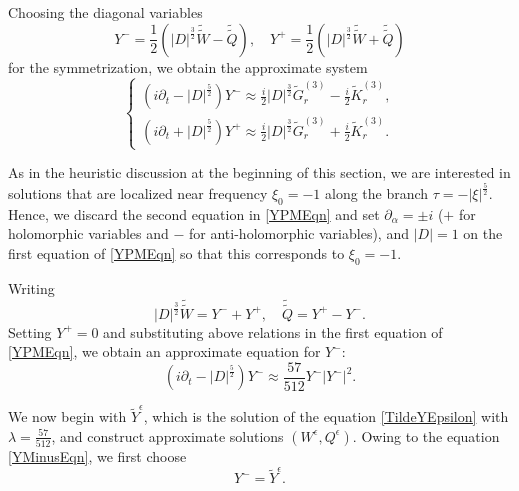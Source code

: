 \documentclass[12pt]{amsart}
\theoremstyle{remark}
\theoremstyle{definition}
\numberwithin{equation}{section}
\newcommand{\p}{\partial}
\newcommand{\al}{\alpha}
\newcommand{\f}{\frac}
\begin{document}
Choosing the diagonal variables  
\begin{equation*}
Y^- = \f12(|D|^\f32\tilde{\tilde{W}}- \tilde{\tilde{Q}}), \quad Y^+ = \f12(|D|^\f32\tilde{\tilde{W}}+ \tilde{\tilde{Q}})
\end{equation*}
for the symmetrization, we obtain the approximate system 
\begin{equation} \label{YPMEqn}
\begin{cases}
(i\partial_t-|D|^\f52)Y^- \approx \frac{i}{2}|D|^{\f32}\tilde{G}_r^{(3)}- \frac{i}{2}\tilde{K}_r^{(3)}, \\
(i\partial_t+|D|^\f52)Y^+ \approx \frac{i}{2}|D|^{\f32}\tilde{G}_r^{(3)}+ \frac{i}{2}\tilde{K}_r^{(3)}.
\end{cases}
\end{equation}

As in the heuristic discussion at the beginning of this section, we are interested in solutions that are localized near frequency $\xi_0 = -1$ along the branch $\tau = - |\xi|^\f52$.
Hence, we discard the second equation in \eqref{YPMEqn} and set $\p_\al = \pm i$ ($+$ for holomorphic variables and $-$ for anti-holomorphic variables), and $|D| = 1$ on the first equation of \eqref{YPMEqn} so that this corresponds to $\xi_0 = -1$.

Writing 
\begin{equation*}
   |D|^{\f32} \tilde{\tilde{W}} = Y^- + Y^+, \quad \tilde{\tilde{Q}} = Y^+ - Y^-.
\end{equation*}
Setting $Y^+ = 0$ and substituting above relations in the first equation of \eqref{YPMEqn}, we obtain an approximate equation for $Y^-$:
\begin{equation} \label{YMinusEqn}
 (i\partial_t-|D|^\f52)Y^- \approx  \f{57}{512} Y^- |Y^-|^2.
\end{equation}

We now begin with $\tilde{Y}^\epsilon$, which is the solution of the equation \eqref{TildeYEpsilon} with $\lambda = \frac{57}{512}$, and construct approximate solutions $(W^\epsilon, Q^\epsilon)$.
Owing to the equation \eqref{YMinusEqn}, we first choose
\begin{equation*}
    Y^- = \tilde{Y}^\epsilon.
\end{equation*}
\end{document}
